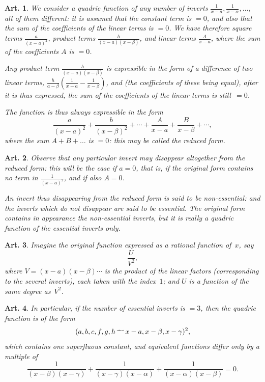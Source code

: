 \documentclass[11pt,a4paper]{article}
\theoremstyle{plain}
\newtheorem{art}{Art.}[section]
\begin{document}
\begin{art}
We consider a quadric function of any number of inverts
$\frac{1}{x-a}, \frac{1}{x-\alpha}, \ldots$, all of them different: it is
assumed that the constant term is $=0$, and also that the sum of the
coefficients of the linear terms is $=0$. We have therefore square terms
$\frac{a}{(x-a)^2}$, product terms $\frac{h}{(x-a)(x-\beta)}$, and linear
terms $\frac{A}{x-a}$, where the sum of the coefficients $A$ is $=0$.

Any product term $\frac{h}{(x-a)(x-\beta)}$ is expressible in the form of a
difference of two linear terms, $\frac{h}{a-\beta}\left(\frac{1}{x-a} - \frac{1}{x-\beta}\right)$,
and (the coefficients of these being equal), after it is thus expressed,
the sum of the coefficients of the linear terms is still~$=0$.

The function is thus always expressible in the form
\[
\frac{a}{(x-a)^2} + \frac{b}{(x-\beta)^2} + \cdots
+ \frac{A}{x-a} + \frac{B}{x-\beta} + \cdots,
\]
where the sum $A + B + \ldots$ is $=0$: this may be called the \textit{reduced form}.
\end{art}

\begin{art}
Observe that any particular invert may disappear altogether from the
reduced form: this will be the case if $a = 0$, that is, if the original
form contains no term in $\frac{1}{(x-a)^2}$, and if also $A = 0$.

An invert thus disappearing from the reduced form is said to be
\textit{non-essential}: and the inverts which do not disappear are said to be
\textit{essential}. The original form contains in appearance the non-essential
inverts, but it is really a quadric function of the essential inverts only.
\end{art}

\begin{art}
Imagine the original function expressed as a rational function of~$x$, say
\[
\frac{U}{V^2},
\]
where $V = (x-a)(x-\beta)\cdots$ is the product of the linear factors
(corresponding to the several inverts), each taken with the index~$1$; and
$U$ is a function of the same degree as~$V^2$.
\end{art}

\begin{art}
In particular, if the number of essential inverts is $=3$, then the quadric
function is of the form
\[
(a, b, c, f, g, h \,\raisebox{-.5ex}{$\widetilde{\phantom{aa}}$}\, x-a, x-\beta, x-\gamma)^2,
\]
which contains one superfluous constant, and equivalent functions differ
only by a multiple of
\[
\frac{1}{(x-\beta)(x-\gamma)} + \frac{1}{(x-\gamma)(x-\alpha)} + \frac{1}{(x-\alpha)(x-\beta)} = 0.
\]
\end{art}
\end{document}

